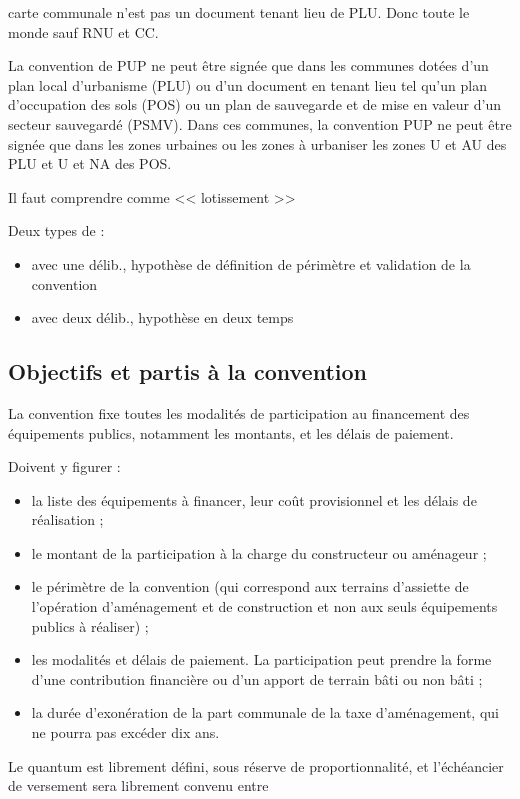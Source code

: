 	carte communale n'est pas un document tenant lieu de PLU. Donc toute le monde sauf RNU et CC.
	
	La convention de PUP ne peut être signée que dans les communes dotées d’un plan local d’urbanisme (PLU) ou d’un document en tenant lieu tel qu’un plan d’occupation des sols (POS) ou un plan de sauvegarde et de mise en valeur d'un secteur sauvegardé (PSMV). Dans ces communes, la convention PUP ne peut être signée que dans les zones urbaines ou les zones à urbaniser \cad les zones U et AU des PLU et U et NA des POS.
	
	Il faut comprendre comme << lotissement >>
	
	Deux types de \PUP : \begin{itemize}
		\item avec une délib., hypothèse de définition de périmètre et validation de la convention
		\item avec deux délib., hypothèse en deux temps
	\end{itemize}

	\subsection{Objectifs et partis à la convention}
	
		La convention fixe toutes les modalités de participation au financement des équipements publics, notamment les montants, et les délais de paiement.
		
		Doivent y figurer :
		\begin{itemize}
			\item la liste des équipements à financer, leur coût provisionnel et les délais de réalisation ;
			\item le montant de la participation à la charge du constructeur ou aménageur ;
			\item le périmètre de la convention (qui correspond aux terrains d’assiette de l’opération d’aménagement et de construction et non aux seuls équipements publics à réaliser) ;
			\item les modalités et délais de paiement. La participation peut prendre la forme d’une contribution financière ou d’un apport de terrain bâti ou non bâti ;
			\item la durée d’exonération de la part communale de la taxe d’aménagement, qui ne pourra pas excéder dix ans.
		\end{itemize}
		
		Le quantum est librement défini, sous réserve de proportionnalité, et l'échéancier de versement sera librement convenu entre 
		
